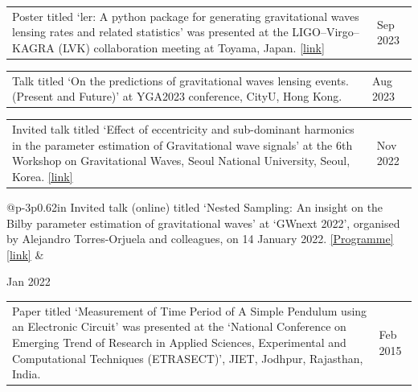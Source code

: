 \documentclass[margin,line]{res}
\begin{document}
\begin{resume}
\begin{tabular}{@{}p{\dimexpr\linewidth-0.62in-3\tabcolsep\relax}p{0.62in}}
Poster titled `ler: A python package for generating gravitational waves lensing rates and related statistics' was presented at the LIGO--Virgo--KAGRA (LVK) collaboration meeting at Toyama, Japan. \href{https://dcc.ligo.org/LIGO-P2400274}{[link]} & \raggedright Sep 2023
\end{tabular}

\begin{tabular}{@{}p{\dimexpr\linewidth-0.62in-3\tabcolsep\relax}p{0.62in}}
Talk titled `On the predictions of gravitational waves lensing events.
(Present and Future)' at YGA2023 conference, CityU, Hong Kong. & \raggedright Aug 2023
\end{tabular}

\begin{tabular}{@{}p{\dimexpr\linewidth-0.62in-3\tabcolsep\relax}p{0.62in}}
Invited talk titled `Effect of eccentricity and sub-dominant harmonics in the parameter estimation of Gravitational wave signals' at the 6th Workshop on Gravitational Waves, Seoul National University, Seoul, Korea. \href{https://drive.google.com/drive/folders/1JK3M1wSCkScemcbeU5dyIeenvnOFwARR?usp=sharing}{[link]} & \raggedright Nov 2022
\end{tabular}

\begin{tabular}{@{}p{\dimexpr\linewidth-0.62in-3\tabcolsep\relax}p{0.62in}}
Invited talk (online) titled `Nested Sampling: An insight on the Bilby parameter estimation of gravitational waves' at `GWnext 2022', organised by Alejandro Torres-Orjuela and colleagues, on 14 January 2022. \href{https://aletorreso.wixsite.com/atogw/gwnext2022}{[Programme]} \href{https://docs.google.com/presentation/d/15u-ndYKA_ytU1wgQ0B0o9my2aA8hvcVb/edit?usp=sharing&ouid=105312759051297421233&rtpof=true&sd=true}{[link]} & \raggedright Jan 2022
\end{tabular}

\begin{tabular}{@{}p{\dimexpr\linewidth-0.62in-3\tabcolsep\relax}p{0.62in}}
Paper titled `Measurement of Time Period of A Simple Pendulum using an Electronic Circuit' was presented at the ‘National Conference on Emerging Trend of Research in Applied Sciences, Experimental and Computational Techniques (ETRASECT)', JIET, Jodhpur, Rajasthan, India. & \raggedright Feb 2015
\end{tabular}




\end{resume}
\end{document}

